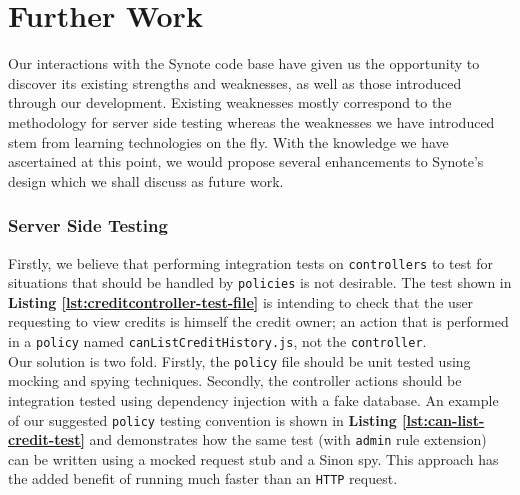 \chapter{Further Work}
\label{chap:further-work}


Our interactions with the Synote code base have given us the opportunity to discover its existing strengths and weaknesses, as well as those introduced through our development. Existing weaknesses mostly correspond to the methodology for server side testing whereas the weaknesses we have introduced stem from learning technologies on the fly. With the knowledge we have ascertained at this point, we would propose several enhancements to Synote's design which we shall discuss as future work.\\ 

\subsection{Server Side Testing}
\label{subsec:server-side-testing}

Firstly, we believe that performing integration tests on \texttt{controllers} to test for situations that should be handled by \texttt{policies} is not desirable. The test shown in \textbf{Listing \ref{lst:creditcontroller-test-file}} is intending to check that the user requesting to view credits is himself the credit owner; an action that is performed in a \texttt{policy} named \texttt{canListCreditHistory.js}, not the \texttt{controller}.\\

Our solution is two fold. Firstly, the \texttt{policy} file should be unit tested using mocking and spying techniques. Secondly, the controller actions should be integration tested using dependency injection with a fake database. An example of our suggested \texttt{policy} testing convention is shown in \textbf{Listing \ref{lst:can-list-credit-test}} and demonstrates how the same test (with \texttt{admin} rule extension) can be written using a mocked request stub and a Sinon spy. This approach has the added benefit of running much faster than an \texttt{HTTP} request.  

